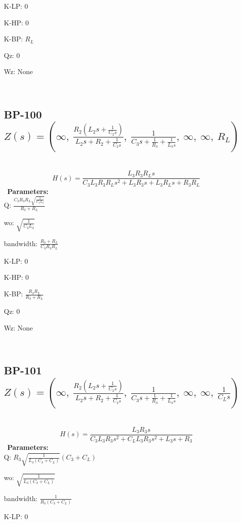 \documentclass{article}
\begin{document}
K-LP: $0$\ 

K-HP: $0$\ 

K-BP: $R_{L}$\ 

Qz: $0$\ 

Wz: $\text{None}$\ 

\ 

\subsection{BP-100 $Z(s) = \left( \infty, \  \frac{R_{2} \left(L_{2} s + \frac{1}{C_{2} s}\right)}{L_{2} s + R_{2} + \frac{1}{C_{2} s}}, \  \frac{1}{C_{3} s + \frac{1}{R_{3}} + \frac{1}{L_{3} s}}, \  \infty, \  \infty, \  R_{L}\right)$ } \ 
\textbf{\[H(s) = \frac{L_{3} R_{3} R_{L} s}{C_{3} L_{3} R_{3} R_{L} s^{2} + L_{3} R_{3} s + L_{3} R_{L} s + R_{3} R_{L}}\] } \ 
\textbf{Parameters:}\\ 

Q: $\frac{C_{3} R_{3} R_{L} \sqrt{\frac{1}{C_{3} L_{3}}}}{R_{3} + R_{L}}$\ 

wo: $\sqrt{\frac{1}{C_{3} L_{3}}}$\ 

bandwidth: $\frac{R_{3} + R_{L}}{C_{3} R_{3} R_{L}}$\ 

K-LP: $0$\ 

K-HP: $0$\ 

K-BP: $\frac{R_{3} R_{L}}{R_{3} + R_{L}}$\ 

Qz: $0$\ 

Wz: $\text{None}$\ 

\ 

\subsection{BP-101 $Z(s) = \left( \infty, \  \frac{R_{2} \left(L_{2} s + \frac{1}{C_{2} s}\right)}{L_{2} s + R_{2} + \frac{1}{C_{2} s}}, \  \frac{1}{C_{3} s + \frac{1}{R_{3}} + \frac{1}{L_{3} s}}, \  \infty, \  \infty, \  \frac{1}{C_{L} s}\right)$ } \ 
\textbf{\[H(s) = \frac{L_{3} R_{3} s}{C_{3} L_{3} R_{3} s^{2} + C_{L} L_{3} R_{3} s^{2} + L_{3} s + R_{3}}\] } \ 
\textbf{Parameters:}\\ 

Q: $R_{3} \sqrt{\frac{1}{L_{3} \left(C_{3} + C_{L}\right)}} \left(C_{3} + C_{L}\right)$\ 

wo: $\sqrt{\frac{1}{L_{3} \left(C_{3} + C_{L}\right)}}$\ 

bandwidth: $\frac{1}{R_{3} \left(C_{3} + C_{L}\right)}$\ 

K-LP: $0$\ 
\end{document}

